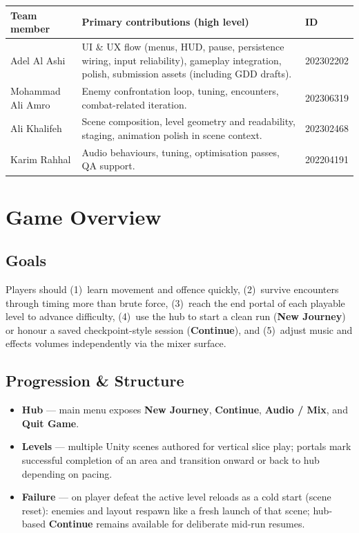 \documentclass[11pt,a4paper]{article}
\begin{document}
\vspace{0.5em}
\begin{tabular}{@{}p{3.8cm}p{9.2cm}p{2cm}@{}}
\toprule
\textbf{Team member} & \textbf{Primary contributions (high level)} & \textbf{ID} \\
\midrule
Adel Al Ashi &
UI \& UX flow (menus, HUD, pause, persistence wiring, input reliability), gameplay integration, polish, submission assets (including GDD drafts). &
202302202 \\
Mohammad Ali Amro &
Enemy confrontation loop, tuning, encounters, combat-related iteration. &
202306319 \\
Ali Khalifeh &
Scene composition, level geometry and readability, staging, animation polish in scene context. &
202302468 \\
Karim Rahhal &
Audio behaviours, tuning, optimisation passes, QA support. &
202204191 \\
\bottomrule
\end{tabular}

\section{Game Overview}

\subsection{Goals}
Players should (1)~learn movement and offence quickly, (2)~survive encounters through timing more than brute force, (3)~reach the end portal of each playable level to advance difficulty, (4)~use the hub to start a clean run (\textbf{New Journey}) or honour a saved checkpoint-style session (\textbf{Continue}), and (5)~adjust music and effects volumes independently via the mixer surface.

\subsection{Progression \& Structure}
\begin{itemize}[leftmargin=*]
    \item \textbf{Hub} --- main menu exposes \textbf{New Journey}, \textbf{Continue}, \textbf{Audio / Mix}, and \textbf{Quit Game}.
    \item \textbf{Levels} --- multiple Unity scenes authored for vertical slice play; portals mark successful completion of an area and transition onward or back to hub depending on pacing.
    \item \textbf{Failure} --- on player defeat the active level reloads as a cold start (scene reset): enemies and layout respawn like a fresh launch of that scene; hub-based \textbf{Continue} remains available for deliberate mid-run resumes.
\end{itemize}
\end{document}
